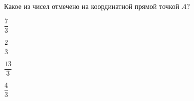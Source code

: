 \begin{ex}
	\begin{condition}
		Какое из чисел отмечено на координатной прямой точкой $A$?
		\selectanswer
		\begin{enumcols}[columns=4]
			\item $\dfrac{7}{3}$
			\item $\dfrac{2}{3}$
			\item $\dfrac{13}{3}$
			\item $\dfrac{4}{3}$
		\end{enumcols}
	\end{condition}
\end{ex}
